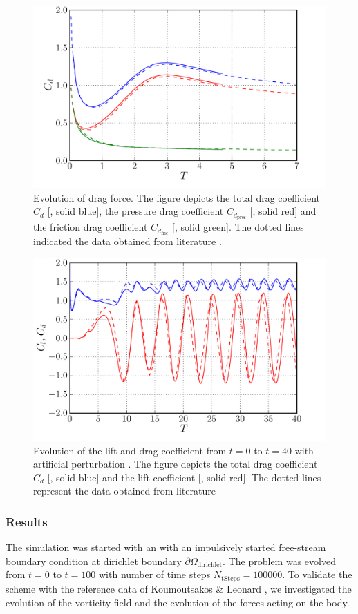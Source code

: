	\begin{figure}[p]
	\centering
	\includegraphics[width=0.7\linewidth]{./figures/eulerian/ISC_dragEvolution.pdf}
	\caption{Evolution of drag force. The figure depicts the total drag coefficient $C_d$ [{\color{plotBlue}{---}}, solid blue], the pressure drag coefficient $C_{d_{\mathrm{pres}}}$ [{\color{plotRed}{---}}, solid red] and the friction drag coefficient $C_{d_{\mathrm{fric}}}$ [{\color{plotGreen}{---}}, solid green]. The dotted lines indicated the data obtained from literature \cite{Koumoutsakos1995a}.}
	\label{fig:ISC_dragEvolution}
	\end{figure}
	
	\begin{figure}[p]
	\centering
	\includegraphics[width=0.7\linewidth]{./figures/eulerian/ISC_LongRun_dragLiftEvolution.pdf}
	\caption{Evolution of the lift and drag coefficient from $t=0$ to $t=40$ with artificial perturbation \cite{Lecointe1984}. The figure depicts the total drag coefficient $C_d$ [{\color{plotBlue}{---}}, solid blue] and the lift coefficient [{\color{plotRed}{---}}, solid red]. The dotted lines represent the data obtained from literature \cite{MosheRosenFeldDochanKwak1991}}
	\label{fig:ISC_LongRun_dragLiftEvolution}
	\end{figure}	

\subsubsection*{Results}
The simulation was started with an with an impulsively started free-stream boundary condition at dirichlet boundary $\partial \Omega_{\mathrm{dirichlet}}$. The problem was evolved from $t=0$ to $t=100$ with number of time steps $N_{\mathrm{tSteps}}=100000$. To validate the scheme with the reference data of Koumoutsakos \& Leonard \cite{Koumoutsakos1995a}, we investigated the evolution of the vorticity field and the evolution of the forces acting on the body.

